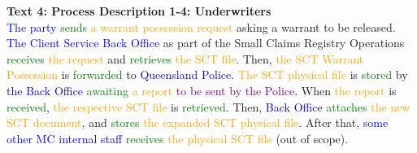 \textbf{Text 4: Process Description 1-4: Underwriters}\\
\textcolor{blue}{The} \textcolor{blue}{party} \textcolor{green}{sends} \textcolor{orange}{a} \textcolor{orange}{warrant} \textcolor{orange}{possession} \textcolor{orange}{request} asking a warrant to be released. \textcolor{blue}{The} \textcolor{blue}{Client} \textcolor{blue}{Service} \textcolor{blue}{Back} \textcolor{blue}{Office} as part of the Small Claims Registry Operations \textcolor{green}{receives} \textcolor{orange}{the} \textcolor{orange}{request} and \textcolor{green}{retrieves} \textcolor{orange}{the} \textcolor{orange}{SCT} \textcolor{orange}{file}. Then, \textcolor{orange}{the} \textcolor{orange}{SCT} \textcolor{orange}{Warrant} \textcolor{orange}{Possession} is \textcolor{green}{forwarded} to \textcolor{blue}{Queensland} \textcolor{blue}{Police}. \textcolor{orange}{The} \textcolor{orange}{SCT} \textcolor{orange}{physical} \textcolor{orange}{file} is \textcolor{green}{stored} by \textcolor{blue}{the} \textcolor{blue}{Back} \textcolor{blue}{Office} \textcolor{green}{awaiting} \textcolor{orange}{a} \textcolor{orange}{report} \textcolor{purple}{to} \textcolor{purple}{be} \textcolor{purple}{sent} \textcolor{purple}{by} \textcolor{purple}{the} \textcolor{purple}{Police}. When \textcolor{orange}{the} \textcolor{orange}{report} is \textcolor{green}{received}, \textcolor{orange}{the} \textcolor{orange}{respective} \textcolor{orange}{SCT} \textcolor{orange}{file} is \textcolor{green}{retrieved}. Then, \textcolor{blue}{Back} \textcolor{blue}{Office} \textcolor{green}{attaches} \textcolor{orange}{the} \textcolor{orange}{new} \textcolor{orange}{SCT} \textcolor{orange}{document}, and \textcolor{green}{stores} \textcolor{orange}{the} \textcolor{orange}{expanded} \textcolor{orange}{SCT} \textcolor{orange}{physical} \textcolor{orange}{file}. After that, \textcolor{blue}{some} \textcolor{blue}{other} \textcolor{blue}{MC} \textcolor{blue}{internal} \textcolor{blue}{staff} \textcolor{green}{receives} \textcolor{orange}{the} \textcolor{orange}{physical} \textcolor{orange}{SCT} \textcolor{orange}{file} (out of scope).

